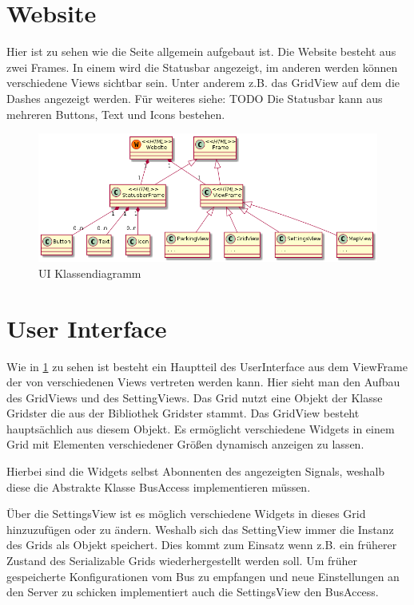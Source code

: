 \documentclass[entwurf.tex]{subfiles}
\begin{document}
	\newpage
  	\section{Website}
  	\label{Class:Website}
		Hier ist zu sehen wie die Seite allgemein aufgebaut ist. Die Website besteht aus zwei Frames. In einem wird die Statusbar angezeigt, im anderen werden können verschiedene Views sichtbar sein. Unter anderem z.B. das GridView auf dem die Dashes angezeigt werden. Für weiteres siehe: TODO %
Die Statusbar kann aus mehreren Buttons, Text und Icons bestehen.
		\begin{figure}[H]
  			\begin{center}
 				\includegraphics[width=\textwidth]{diagrams/website.png}
  				\caption{UI Klassendiagramm}
  			\end{center}
  		\end{figure}  	
  	
  	\newpage
  	\section{User Interface}
		Wie in \ref{Class:Website} zu sehen ist besteht ein Hauptteil des UserInterface aus dem ViewFrame der von verschiedenen Views vertreten werden kann. Hier sieht man den Aufbau des GridViews und des SettingViews. Das Grid nutzt eine Objekt der Klasse Gridster die aus der Bibliothek Gridster stammt. Das GridView besteht hauptsächlich aus diesem Objekt. Es ermöglicht verschiedene Widgets in einem Grid mit Elementen verschiedener Größen dynamisch anzeigen zu lassen.
		
		Hierbei sind die Widgets selbst Abonnenten des angezeigten Signals, weshalb diese die Abstrakte Klasse BusAccess implementieren müssen.
		
		Über die SettingsView ist es möglich verschiedene Widgets in dieses Grid hinzuzufügen oder zu ändern. Weshalb sich das SettingView immer die Instanz des Grids als Objekt speichert. Dies kommt zum Einsatz wenn z.B. ein früherer Zustand des Serializable Grids wiederhergestellt werden soll. Um früher gespeicherte Konfigurationen vom Bus zu empfangen und neue Einstellungen an den Server zu schicken implementiert auch die SettingsView den BusAccess. 
		
\end{document}

